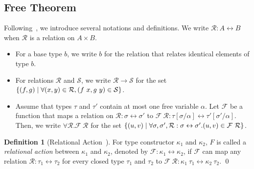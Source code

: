 \documentclass{article}
\theoremstyle{definition}
\newtheorem{definition}{Definition}
\newcommand{\BIND}{\mathbin{\texttt{>\!>\!=}}}
\begin{document}
\subsection{Free Theorem}
Following~\cite{Voigtlander09ft}, we introduce several notations and
definitions.  We write $\mathcal{R} : A \leftrightarrow B$ when
$\mathcal{R}$ is a relation on $A \times B$.
\begin{itemize}
\item For a base type $b$, we write $b$ for the relation that relates 
  identical elements of type $b$. 

 \item For relations $\mathcal{R}$ and $\mathcal{S}$, we
   write $\mathcal{R} \to \mathcal{S}$ for 
   the set $\set{(f,g) \mid \forall (x,y) \in \mathcal{R}, (f~x, g~y) \in \mathcal{S}}$.
 \item Assume that types $\tau$ and $\tau'$ contain at most one free variable $\alpha$. Let $\mathcal{F}$ be a function that maps a relation on $\mathcal{R}: \sigma \leftrightarrow \sigma'$ to $\mathcal{F}~\mathcal{R}: \tau[\sigma/\alpha] \leftrightarrow \tau'[\sigma'/\alpha]$. 
Then, we write $\forall \mathcal{R}.\mathcal{F}~\mathcal{R}$ for the set
$\set{ (u,v) \mid \forall \sigma,\sigma', \mathcal{R} : \sigma \leftrightarrow \sigma'. (u,v) \in \mathcal{F}~\mathcal{R} }$.
\end{itemize} 

\begin{definition}[Relational Action~\cite{Voigtlander09ft}]
For type constructor $\kappa_1$ and $\kappa_2$, $F$ is called a 
\emph{relational action} between $\kappa_1$ and $\kappa_2$, denoted by $\mathcal{F} : \kappa_1 \leftrightarrow \kappa_2$, if 
$\mathcal{F}$ can map any relation $\mathcal{R} : \tau_1 \leftrightarrow \tau_2$ for every closed type $\tau_1$ and $\tau_2$ to $\mathcal{F}~\mathcal{R} : \kappa_1 ~\tau_1 \leftrightarrow \kappa_2 ~\tau_2$.
\qed \end{definition}

\end{document}
